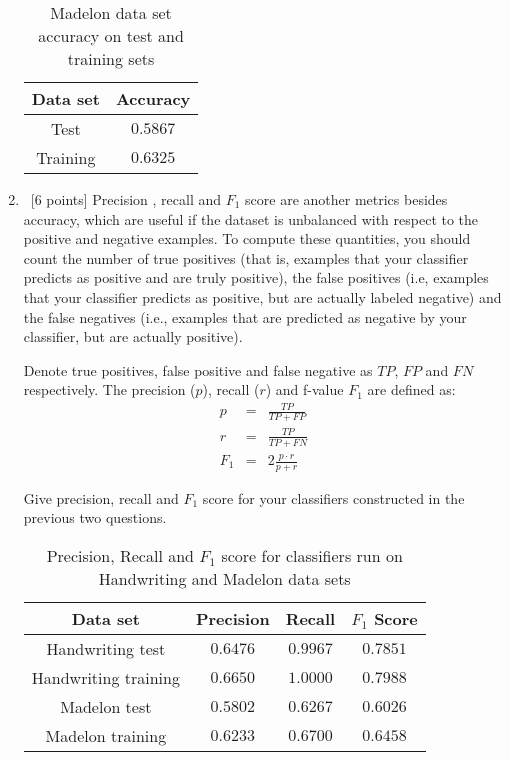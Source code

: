 \begin{enumerate}
    \begin{table}[H]
    \centering
    \begin{tabular}{| c | c |}
      \hline
      Data set & Accuracy  \\
      \hline
      Test & $0.5867$\\
      \hline
      Training & $0.6325$\\
      \hline
    \end{tabular}
    \caption{Madelon data set accuracy on test and training sets}
  \end{table}   

\item ~[6 points] Precision , recall and $ F_1$ score are another
  metrics besides accuracy, which are useful if the dataset is
  unbalanced with respect to the positive and negative examples. To
  compute these quantities, you should count the number of true
  positives (that is, examples that your classifier predicts as
  positive and are truly positive), the false positives (i.e, examples
  that your classifier predicts as positive, but are actually labeled
  negative) and the false negatives (i.e., examples that are predicted
  as negative by your classifier, but are actually positive).
  
  Denote true positives, false positive and false negative as $TP$, $FP$
  and $FN$ respectively. The precision ($p$), recall ($r$) and f-value
  $F_1$ are defined as:
  \begin{eqnarray*}
    p   & = & \frac{TP}{TP + FP} \\
    r   & = & \frac{TP}{TP+FN}   \\
    F_1 & = & 2 \frac{p \cdot r}{p + r} 
  \end{eqnarray*}

  Give precision, recall and $F_1$ score for your classifiers
  constructed in the previous two questions.

    \begin{table}[H]
    \centering
    \begin{tabular}{| c | c | c | c |}
      \hline
      Data set & Precision & Recall & $F_1$ Score  \\
      \hline
      Handwriting test& $0.6476$& $0.9967$& $0.7851$\\
      \hline
      Handwriting training& $0.6650$& $1.0000$& $0.7988$\\
      \hline
      Madelon test& $0.5802$& $0.6267$& $0.6026$\\
      \hline
      Madelon training& $0.6233$& $0.6700$& $0.6458$\\
      \hline
    \end{tabular}
    \caption{Precision, Recall and $F_1$ score for classifiers run on Handwriting and Madelon data sets}
  \end{table}   
\end{enumerate}

